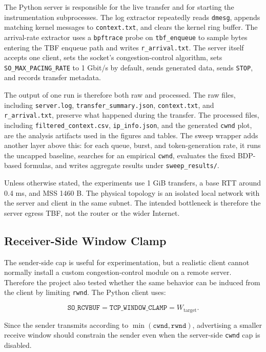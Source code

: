 \documentclass{article}
\newcommand{\code}[1]{\texttt{#1}}
\begin{document}
The Python server is responsible for the live transfer and for starting the instrumentation subprocesses. The 
log extractor repeatedly reads \code{dmesg}, appends matching kernel messages to \code{context.txt}, and clears the 
kernel ring buffer. The arrival-rate extractor uses a \code{bpftrace} probe on \code{tbf\_enqueue} to sample bytes 
entering the TBF enqueue path and writes \code{r\_arrival.txt}. The server itself accepts one client, sets the socket's 
congestion-control algorithm, sets \code{SO\_MAX\_PACING\_RATE} to 1 Gbit/s by default, sends generated data, sends 
\code{STOP}, and records transfer metadata.

The output of one run is therefore both raw and processed. The raw files, including \code{server.log}, 
\code{transfer\_summary.json}, \code{context.txt}, and \code{r\_arrival.txt}, preserve what happened during the transfer. 
The processed files, including \code{filtered\_context.csv}, \code{ip\_info.json}, and the generated \code{cwnd} plot, 
are the analysis artifacts used in the figures and tables. The sweep wrapper adds another layer above this: for each queue, burst, and token-generation rate, 
it runs the uncapped baseline, searches for an empirical \code{cwnd}, evaluates the fixed BDP-based formulas, and 
writes aggregate results under \code{sweep\_results/}.

Unless otherwise stated, the experiments use 1 GiB transfers, a base RTT around 0.4 ms, and MSS 1460 B. The physical 
topology is an isolated local network with the server and client in the same subnet. The intended bottleneck is therefore 
the server egress TBF, not the router or the wider Internet.

\subsection{Receiver-Side Window Clamp}

The sender-side cap is useful for experimentation, but a realistic client cannot normally install a custom congestion-control 
module on a remote server. Therefore the project also tested whether the same behavior can be induced from 
the client by limiting \code{rwnd}. The Python client uses:

\[
\code{SO\_RCVBUF} = \code{TCP\_WINDOW\_CLAMP} = W_{\mathrm{target}}.
\]

Since the sender transmits according to \(\min(\code{cwnd}, \code{rwnd})\), advertising a smaller receive window should 
constrain the sender even when the server-side \code{cwnd} cap is disabled.
\end{document}
